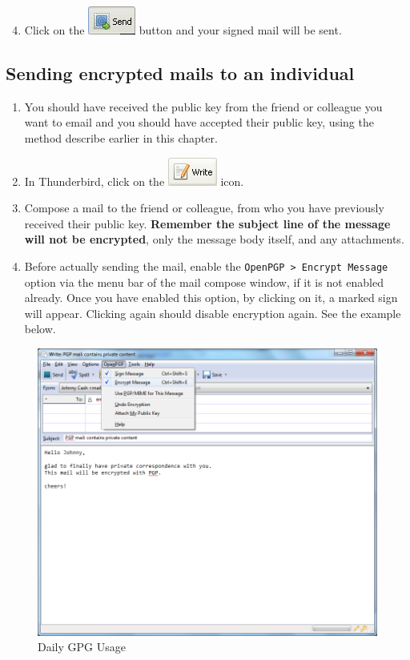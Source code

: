 \begin{enumerate}[1.]
\setcounter{enumi}{3}
\item
  Click on the \includegraphics{gpg_send.png} button and your signed
  mail will be sent.
\end{enumerate}
\subsection{Sending encrypted mails to an individual}

\begin{enumerate}[1.]
\item
  You should have received the public key from the friend or colleague
  you want to email and you should have accepted their public key, using
  the method describe earlier in this chapter.
\item
  In Thunderbird, click on the \includegraphics{gpg_write.png} icon.
\item
  Compose a mail to the friend or colleague, from who you have
  previously received their public key. \textbf{Remember the subject
  line of the message will not be encrypted}, only the message body
  itself, and any attachments.
\item
  Before actually sending the mail, enable the
  \verb!OpenPGP > Encrypt Message! option via the menu bar of the mail
  compose window, if it is not enabled already. Once you have enabled
  this option, by clicking on it, a marked sign will appear. Clicking
  again should disable encryption again. See the example below.
\end{enumerate}
\begin{figure}[htbp]
\centering
\includegraphics{daily_gpg_22.png}
\caption{Daily GPG Usage}
\end{figure}

